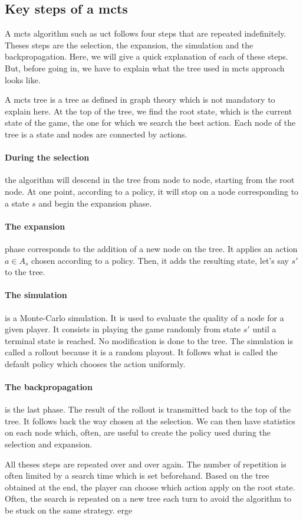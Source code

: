 \subsection{Key steps of a \acrshort{mcts}}%
\label{sub:key_components_of_a_mcts}

A \gls{mcts} algorithm such as \gls{uct} follows four steps that are repeated indefinitely.
Theses steps are the selection, the expansion, the simulation and the backpropagation.
Here, we will give a quick explanation of each of these steps.
But, before going in, we have to explain what the tree used in \gls{mcts} approach looks like.

A \gls{mcts} tree is a tree as defined in graph theory which is not mandatory to explain here. 
At the top of the tree, we find the root state, which is the current state of the game, the one for which we search the best action.
Each node of the tree is a state and nodes are connected by actions. 

\paragraph*{During the selection}
the algorithm will descend in the tree from node to node, starting from the root node.
At one point, according to a policy, it will stop on a node corresponding to a state \(s\) and begin the expansion phase.

\paragraph*{The expansion}
phase corresponds to the addition of a new node on the tree.
It applies an action \(a \in A_{s}\) chosen according to a policy.
Then, it adds the resulting state, let's say \(s'\) to the tree.

\paragraph*{The simulation}
is a Monte-Carlo simulation.
It is used to evaluate the quality of a node for a given player.
It consists in playing the game randomly from state \(s'\) until a terminal state is reached.
No modification is done to the tree.
The simulation is called a rollout because it is a random playout.
It follows what is called the default policy which chooses the action uniformly.

\paragraph{The backpropagation}
is the last phase.
The result of the rollout is transmitted back to the top of the tree.
It follows back the way chosen at the selection.
We can then have statistics on each node which, often, are useful to create the policy used during the selection and expansion.

All theses steps are repeated over and over again.
The number of repetition is often limited by a search time which is set beforehand.
Based on the tree obtained at the end, the player can choose which action apply on the root state.
Often, the search is repeated on a new tree each turn to avoid the algorithm to be stuck on the same strategy.
erge



